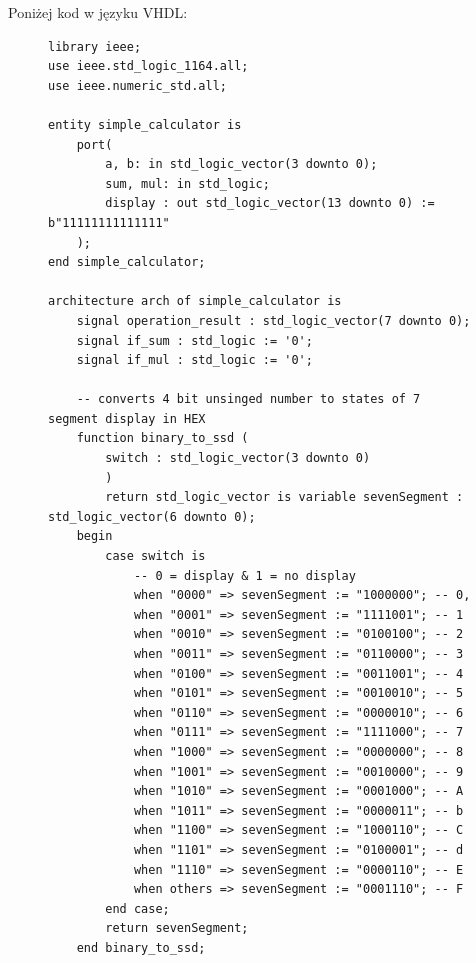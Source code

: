 \documentclass{article}
\begin{document}
Poniżej kod w języku VHDL:

\begin{figure}[H]
\begin{adjustwidth}{-1.3in}{-.7in} 
\centering
\begin{verbatim}
library ieee;
use ieee.std_logic_1164.all;
use ieee.numeric_std.all;

entity simple_calculator is
    port(
        a, b: in std_logic_vector(3 downto 0);
        sum, mul: in std_logic;
        display : out std_logic_vector(13 downto 0) := b"11111111111111"
    );
end simple_calculator;

architecture arch of simple_calculator is
    signal operation_result : std_logic_vector(7 downto 0);
    signal if_sum : std_logic := '0';
    signal if_mul : std_logic := '0';

    -- converts 4 bit unsinged number to states of 7 segment display in HEX
    function binary_to_ssd (
        switch : std_logic_vector(3 downto 0)
        )
        return std_logic_vector is variable sevenSegment : std_logic_vector(6 downto 0);
    begin 
        case switch is 
            -- 0 = display & 1 = no display
            when "0000" => sevenSegment := "1000000"; -- 0, 
            when "0001" => sevenSegment := "1111001"; -- 1
            when "0010" => sevenSegment := "0100100"; -- 2
            when "0011" => sevenSegment := "0110000"; -- 3 
            when "0100" => sevenSegment := "0011001"; -- 4
            when "0101" => sevenSegment := "0010010"; -- 5
            when "0110" => sevenSegment := "0000010"; -- 6
            when "0111" => sevenSegment := "1111000"; -- 7
            when "1000" => sevenSegment := "0000000"; -- 8
            when "1001" => sevenSegment := "0010000"; -- 9
            when "1010" => sevenSegment := "0001000"; -- A
            when "1011" => sevenSegment := "0000011"; -- b
            when "1100" => sevenSegment := "1000110"; -- C
            when "1101" => sevenSegment := "0100001"; -- d
            when "1110" => sevenSegment := "0000110"; -- E
            when others => sevenSegment := "0001110"; -- F
        end case;
        return sevenSegment;
    end binary_to_ssd;
\end{verbatim}
\end{adjustwidth}
\end{figure}
\end{document}
